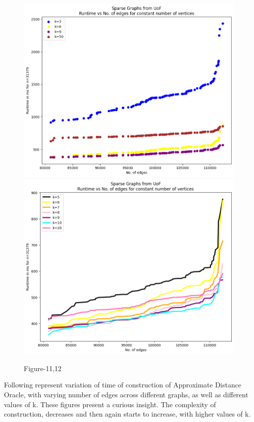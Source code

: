 \documentclass[12pt, a4paper]{article}
\begin{document}
    \begin{figure}[H]
    \caption*{Figure-11,12}
    
        \centering
    \includegraphics[scale=0.4]{./sparse/3}
     \includegraphics[scale=0.4]{./sparse/15}
    \end{figure}    

    Following represent variation of time of construction of Approximate Distance Oracle, with varying number of edges across different graphs, as well as different values of k. 
    These figures present a curious insight. The complexity of construction, decreases and then again starts to increase, with higher values of k.
\end{document}
